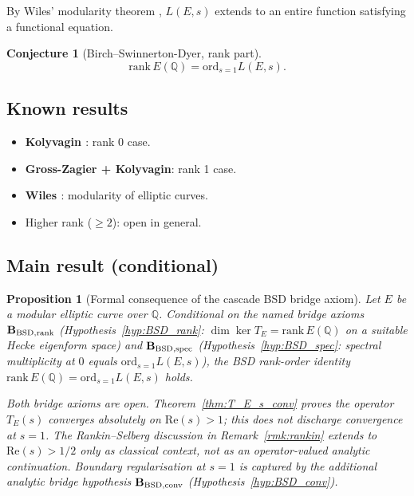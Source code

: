 \documentclass[11pt, a4paper]{amsart}
\newtheorem{proposition}[theorem]{Proposition}
\newtheorem{conjecture}[theorem]{Conjecture}
\theoremstyle{definition}
\newcommand{\Q}{\mathbb{Q}}
\begin{document}
By Wiles' modularity theorem \cite{Wiles1995}, $L(E, s)$ extends to
an entire function satisfying a functional equation.

\begin{conjecture}[Birch--Swinnerton-Dyer, rank part]\label{conj:BSD}
\[
\mathrm{rank}\, E(\Q) = \mathrm{ord}_{s=1} L(E, s).
\]
\end{conjecture}

\subsection{Known results}

\begin{itemize}
\item \textbf{Kolyvagin \cite{Kolyvagin1988}}: rank 0 case.
\item \textbf{Gross-Zagier \cite{GrossZagier1986} + Kolyvagin}: rank 1 case.
\item \textbf{Wiles \cite{Wiles1995}}: modularity of elliptic curves.
\item Higher rank ($\geq 2$): open in general.
\end{itemize}

\subsection{Main result (conditional)}

\begin{proposition}[Formal consequence of the cascade BSD bridge axiom]\label{thm:BSD}
Let $E$ be a modular elliptic curve over $\Q$. Conditional on the
named bridge axioms $\mathbf{B_{\rm BSD,rank}}$
(Hypothesis~\ref{hyp:BSD_rank}: $\dim\ker T_E = \mathrm{rank}\,E(\Q)$
on a suitable Hecke eigenform space) and $\mathbf{B_{\rm BSD,spec}}$
(Hypothesis~\ref{hyp:BSD_spec}: spectral multiplicity at $0$ equals
$\mathrm{ord}_{s=1} L(E,s)$), the BSD rank-order identity
$\mathrm{rank}\, E(\Q) = \mathrm{ord}_{s=1} L(E, s)$ holds.

\emph{Both bridge axioms are open. Theorem~\ref{thm:T_E_s_conv}
proves the operator $T_E(s)$ converges absolutely on
$\mathrm{Re}(s) > 1$; this does \emph{not} discharge convergence
at $s=1$. The Rankin--Selberg discussion in Remark~\ref{rmk:rankin}
extends to $\mathrm{Re}(s)>1/2$ only as classical context, not as
an operator-valued analytic continuation. Boundary regularisation
at $s=1$ is captured by the additional analytic bridge hypothesis
$\mathbf{B_{\rm BSD,conv}}$ (Hypothesis~\ref{hyp:BSD_conv}).}
\end{proposition}
\end{document}
